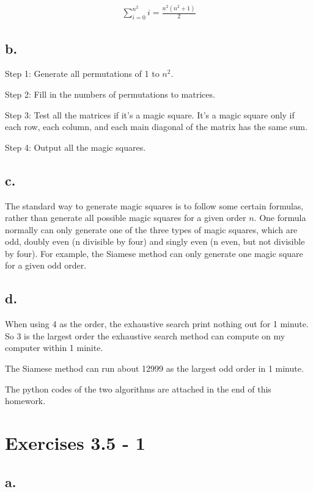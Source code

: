 \documentclass{article}
\begin{document}
\begin{align*}
\sum_{i=0}^{n^2}i = \frac{n^2(n^2+1)}{2}
\end{align*}

\subsection*{b.}

Step 1: Generate all permutations of 1 to $n^2$.

Step 2: Fill in the numbers of permutations to matrices.

Step 3: Test all the matrices if it's a magic square. It's a magic square only if each row, each column, and each main diagonal of the matrix has the same sum.

Step 4: Output all the magic squares.

\subsection*{c.}

The standard way to generate magic squares is to follow some certain formulas, rather than generate all possible magic squares for a given order $n$. One formula normally can only generate one of the three types of magic squares, which are odd, doubly even (n divisible by four) and singly even (n even, but not divisible by four). For example, the Siamese method can only generate one magic square for a given odd order.

\subsection*{d.}

When using 4 as the order, the exhaustive search print nothing out for 1 minute. So 3 is the largest order the exhaustive search method can compute on my computer within 1 minite.

The Siamese method can run about 12999 as the largest odd order in 1 minute.

The python codes of the two algorithms are attached in the end of this homework.

\section{Exercises 3.5 - 1}

\subsection*{a.}
\end{document}
